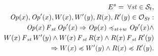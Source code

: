 \documentclass[journal,compsoc]{IEEEtran}
\begin{document}
    \begin{align}\label{eqn:PC}
\begin{split}
E^{s} = \; \forall \mathit{st} \in \mathcal{S}_t, \\ {\mathit{Op}}(x), {\mathit{Op}}'(x), W(x), W'(y), R(x), R'(y) \in \mathcal{O}_{St} : \\
  \mathit{Op}(x) \operatorname{\it F}_\mathit{st} {\mathit{Op}}'(x) \Rightarrow  {\mathit{Op}}(x) \preccurlyeq_{\mathit{st}+w} {\mathit{Op}}'(x)  \wedge \\ W(x) \operatorname{\it F}_\mathit{st} W'(y) \wedge W(x) \operatorname{\it F}_\mathit{st} R(x) \wedge R(x) \operatorname{\it F}_\mathit{st} R'(y) \\\Rightarrow  W(x) \preccurlyeq W'(y) \wedge R(x) \preccurlyeq R'(y).
\end{split}
  \end{align}
\end{document}
